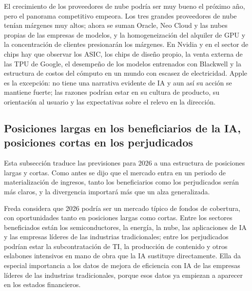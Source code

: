 El crecimiento de los proveedores de nube podría ser muy bueno el próximo año, pero el panorama competitivo empeora. Los tres grandes proveedores de nube tenían márgenes muy altos; ahora se suman Oracle, Neo Cloud y las nubes propias de las empresas de modelos, y la homogeneización del alquiler de GPU y la concentración de clientes presionarán los márgenes. En Nvidia y en el sector de chips hay que observar los ASIC, los chips de diseño propio, la venta externa de las TPU de Google, el desempeño de los modelos entrenados con Blackwell y la estructura de costos del cómputo en un mundo con escasez de electricidad. Apple es la excepción: no tiene una narrativa evidente de IA y aun así su acción se mantiene fuerte; las razones podrían estar en su cultura de producto, su orientación al usuario y las expectativas sobre el relevo en la dirección.

\subsection{Posiciones largas en los beneficiarios de la IA, posiciones cortas en los perjudicados}

Esta subsección traduce las previsiones para 2026 a una estructura de posiciones largas y cortas. Como antes se dijo que el mercado entra en un periodo de materialización de ingresos, tanto los beneficiarios como los perjudicados serán más claros, y la divergencia importará más que un alza generalizada.

Freda considera que 2026 podría ser un mercado típico de fondos de cobertura, con oportunidades tanto en posiciones largas como cortas. Entre los sectores beneficiados están los semiconductores, la energía, la nube, las aplicaciones de IA y las empresas líderes de las industrias tradicionales; entre los perjudicados podrían estar la subcontratación de TI, la producción de contenido y otros eslabones intensivos en mano de obra que la IA sustituye directamente. Ella da especial importancia a los datos de mejora de eficiencia con IA de las empresas líderes de las industrias tradicionales, porque esos datos ya empiezan a aparecer en los estados financieros.

